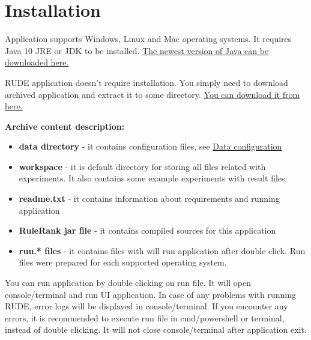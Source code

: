 \section{Installation}\label{section:install}

Application supports Windows, Linux and Mac operating systems. It requires Java 10 JRE or JDK to be installed. \href{http://www.oracle.com/technetwork/java/javase/downloads/index.html}{The newest version of Java can be downloaded here.} 

RUDE application doesn't require installation. You simply need to download archived application and extract it to some directory. \href{http://www.cs.put.poznan.pl/mszelag/Software/ruleRank/ruleRank.html}{You can download it from here.}\newline

\textbf{Archive content description:}
\begin{itemize}
	\item \textbf{data directory} - it contains configuration files, see \hyperref[section:data-config]{Data configuration}
	\item \textbf{workspace} - it is default directory for storing all files related with experiments. It also contains some example experiments with result files.
	\item \textbf{readme.txt} - it contains information about requirements and running application
	\item \textbf{RuleRank jar file} - it contains compiled sources for this application
	\item \textbf{run.* files} - it contains files with will run application after double click. Run files were prepared for each supported operating system.
\end{itemize}

You can run application by double clicking on run file. It will open console/terminal and run UI application. In case of any problems with running RUDE, error logs will be displayed in console/terminal. If you encounter any errors, it is recommended to execute run file in cmd/powershell or terminal, instead of double clicking. It will not close console/terminal after application exit.


\vfill\newpage